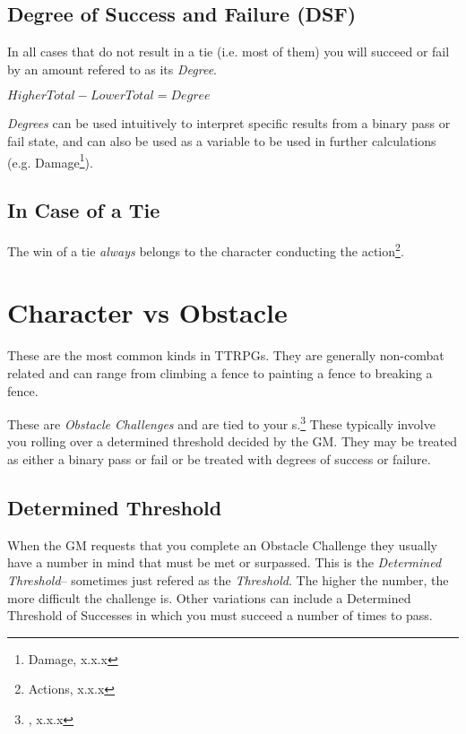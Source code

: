 
\subsection{Degree of Success and Failure (DSF)}
In all cases that do not result in a tie (i.e. most of them) you will
succeed or fail by an amount refered to as its \emph{Degree}. 

$Higher Total - Lower Total = Degree$

\emph{Degrees} can be used intuitively to interpret specific results from
a binary pass or fail state, and can also be used as a variable to be used in further calculations
(e.g. Damage\footnote{Damage, x.x.x}).

\subsection{In Case of a Tie}
The win of a tie \emph{always} belongs to the character conducting
the action\footnote{Actions, x.x.x}.

\section{Character vs Obstacle}
These are the most common kinds in TTRPGs. They are generally non-combat
related and can range from climbing a fence to painting a fence to
breaking a fence. 

These are \emph{Obstacle Challenges} and are tied to your \attribute s.\footnote{\attribute, x.x.x}
These typically involve you rolling over a determined threshold decided
by the GM. They may be treated as either a binary pass or fail or be
treated with degrees of success or failure.

\subsection{Determined Threshold}
When the GM requests that you complete an Obstacle Challenge they
usually have a number in mind that must be met or surpassed. This
is the \emph{Determined Threshold}-- sometimes just refered as the \emph{Threshold}. The higher the number, the more
difficult the challenge is. Other variations can include a Determined
Threshold of Successes in
which you must succeed a number of times to pass.

